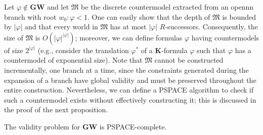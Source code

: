 \documentclass[copyright,creativecommons]{eptcs}
\newcommand{\GWL}{\mathbf{GW}}
\newcommand{\KL}{\mathbf{K}}
\newcommand{\size}[1]{|#1|}
\newcommand{\M}{\mathfrak{M}}
\begin{document}
\noindent
Let $\varphi \notin \GWL$ and let $\M$ be the discrete countermodel
extracted from an opennn branch with root $w_0:\varphi < 1$. One can
easily show that the depth of $\M$ is bounded by $\size{\varphi}$ and
that every world in $\M$ has at most $\size{\varphi}$ $R$-successors.
Consequently, the size of $\M$ is
$O(\size{\varphi}^{\size{\varphi}})$; moreover, we can define formulas
$\varphi$ having countermodels of size $2^{\size{\varphi}}$ (e.g.,
consider the translation $\varphi^*$ of a $\KL$-formula $\varphi$ such
that $\varphi$ has a countermodel of exponential size).  Note that
$\M$ cannot be constructed incrementally, one branch at a time, since
the constraints generated during the expansion of a branch have global
validity and must be preserved throughout the entire construction.
Nevertheless, we can define a PSPACE algorithm to check if such a
countermodel exists without effectively constructing it; this is
discussed in the proof of the next proposition.

\begin{proposition}
The validity problem for $\GWL$ is PSPACE-complete.  
\end{proposition}
\end{document}
